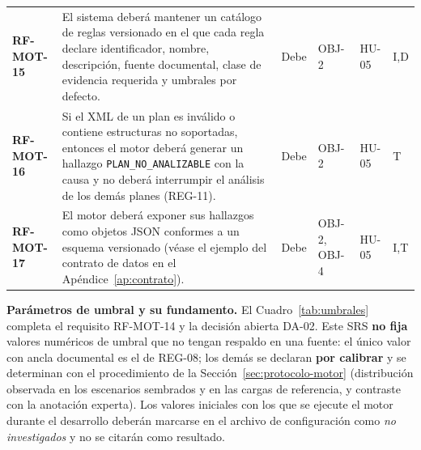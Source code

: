 \documentclass[11pt,a4paper]{report}
\begin{document}
\begin{footnotesize}
\begin{xltabular}{\linewidth}{@{}p{1.7cm}Xp{1.1cm}p{1.3cm}p{1.6cm}p{0.9cm}@{}}
\textbf{RF-MOT-15} & El sistema deberá mantener un catálogo de reglas versionado en el que cada regla declare identificador, nombre, descripción, fuente documental, clase de evidencia requerida y umbrales por defecto. & Debe & OBJ-2 & HU-05 & I,D \\
\textbf{RF-MOT-16} & Si el XML de un plan es inválido o contiene estructuras no soportadas, entonces el motor deberá generar un hallazgo \texttt{PLAN\_NO\_ANALIZABLE} con la causa y no deberá interrumpir el análisis de los demás planes (REG-11). & Debe & OBJ-2 & HU-05 & T \\
\textbf{RF-MOT-17} & El motor deberá exponer sus hallazgos como objetos JSON conformes a un esquema versionado (v\'ease el ejemplo del contrato de datos en el Ap\'endice~\ref{ap:contrato}). & Debe & OBJ-2, OBJ-4 & HU-05 & I,T \\
\end{xltabular}
\end{footnotesize}

\medskip
\textbf{Par\'ametros de umbral y su fundamento.} El Cuadro~\ref{tab:umbrales} completa el requisito RF-MOT-14 y la decisi\'on abierta DA-02. Este SRS \textbf{no fija} valores num\'ericos de umbral que no tengan respaldo en una fuente: el \'unico valor con ancla documental es el de REG-08; los dem\'as se declaran \textbf{por calibrar} y se determinan con el procedimiento de la Secci\'on~\ref{sec:protocolo-motor} (distribuci\'on observada en los escenarios sembrados y en las cargas de referencia, y contraste con la anotaci\'on experta). Los valores iniciales con los que se ejecute el motor durante el desarrollo deber\'an marcarse en el archivo de configuraci\'on como \textit{no investigados} y no se citar\'an como resultado.
\end{document}
